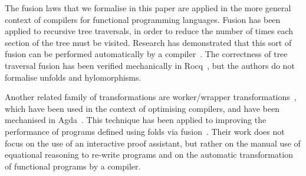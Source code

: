 \documentclass[a4paper,UKenglish,cleveref, autoref, thm-restate]{lipics-v2021}
\newcommand{\haskell}[1]{\texttt{#1}}
\begin{document}
The fusion laws that we formalise in this paper are applied in the more general
context of compilers for functional programming languages.  Fusion has been
applied to recursive tree traversals, in order to reduce the number of times
each section of the tree must be visited. Research has demonstrated that this
sort of fusion can be performed automatically by a
compiler~\cite{10.1145/3133900}. The correctness of tree traversal fusion has
been verified mechanically in Rocq~\cite{10.1145/3377555.3377884}, but the
authors do not formalise unfolds and hylomorphisms.

Another related family of transformations are worker/wrapper
transformations~\cite{gill09}, which have been used in the context of optimising
compilers, and have been mechanised in Agda~\cite{SCULTHORPE_HUTTON_2014}. This
technique has been applied to improving the performance of programs defined
using folds via fusion~\cite{hutton10}. Their work does not focus on the use of
an interactive proof assistant, but rather on the manual use of equational
reasoning to re-write programs and on the automatic transformation of functional
programs by a compiler.




\end{document}

